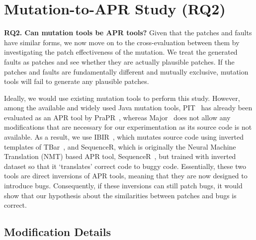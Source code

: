 \documentclass[conference]{IEEEtran}
\newcommand\inv[1]{#1\raisebox{1.15ex}{$\scriptscriptstyle-\!1$}}
\begin{document}
\section{Mutation-to-APR Study (RQ2)}
\label{sec:RQ2}

\textbf{RQ2. Can mutation tools be APR tools?} 
Given that the patches and faults have similar forms, we now move on to the
cross-evaluation between them by investigating the patch effectiveness of the
mutation. We treat the generated faults as patches and see whether they are
actually plausible patches. If the patches and faults are fundamentally
different and mutually exclusive, mutation tools will fail to generate any
plausible patches.

Ideally, we would use existing mutation tools to perform this study.
However, among the available and widely used Java mutation tools,
PIT~\cite{coles2016pit} has already been evaluated as an APR tool by
PraPR~\cite{ghanbari2019practical}, whereas Major~\cite{just2014major} does not
allow any modifications that are necessary for our experimentation as its source
code is not available. As a result, we use IBIR~\cite{khanfir2020ibir}, which
mutates source code using inverted templates of TBar~\cite{liu2019tbar}, and
\inv{SequenceR}, which is originally the Neural Machine Translation (NMT) based
APR tool, SequenceR~\cite{chen2019sequencer}, but trained with inverted dataset
so that it `translates' correct code to buggy code. Essentially, these two tools
are direct inversions of APR tools, meaning that they are now designed to
introduce bugs. Consequently, if these inversions can still patch bugs, it would
show that our hypothesis about the similarities between patches and bugs is
correct.

\subsection{Modification Details}
\label{sec:RQ2_modification}
\end{document}
